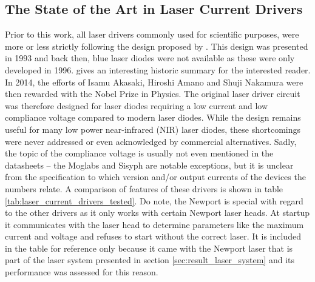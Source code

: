\subsection{The State of the Art in Laser Current Drivers}
Prior to this work, all laser drivers commonly used for scientific purposes, were more or less strictly following the design proposed by \citeauthor{libbrecht_hall} \cite{libbrecht_hall}. This design was presented in 1993 and back then, blue laser diodes were not available as these were only developed in 1996. \citeauthor{blue_laser_diodes_history} \cite{blue_laser_diodes_history} gives an interesting historic summary for the interested reader. In 2014, the efforts of Isamu Akasaki, Hiroshi Amano and Shuji Nakamura were then rewarded with the Nobel Prize in Physics. The original laser driver circuit was therefore designed for laser diodes requiring a low current and low compliance voltage compared to modern laser diodes. While the design remains useful for many low power near-infrared (NIR) laser diodes, these shortcomings were never addressed or even acknowledged by commercial alternatives. Sadly, the topic of the compliance voltage is usually not even mentioned in the datasheets -- the Moglabs  and Sisyph  are notable exceptions, but it is unclear from the specification to which version and/or output currents of the devices the numbers relate. A comparison of features of these drivers is shown in table \ref{tab:laser_current_drivers_tested}. Do note, the Newport  is special with regard to the other drivers as it only works with certain Newport laser heads. At startup it communicates with the laser head to determine parameters like the maximum current and voltage and refuses to start without the correct laser. It is included in the table for reference only because it came with the Newport  laser that is part of the laser system presented in section \ref{sec:result_laser_system} and its performance was assessed for this reason.
